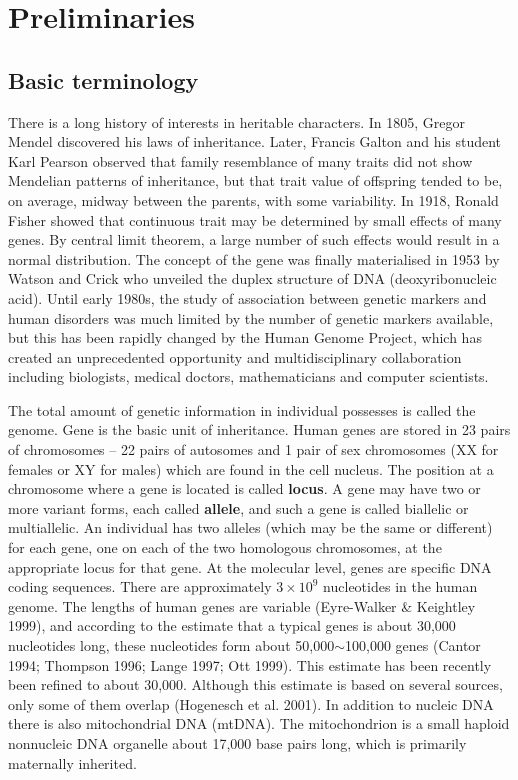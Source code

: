 \chapter{Preliminaries}

\section{Basic terminology}

There is a long history of interests in heritable characters.  In 1805, Gregor
Mendel discovered his laws of inheritance.  Later, Francis Galton and his
student Karl Pearson observed that family resemblance of many traits did not
show Mendelian patterns of inheritance, but that trait value of offspring
tended to be, on average, midway between the parents, with some variability.
In 1918, Ronald Fisher showed that continuous trait may be determined by small
effects of many genes.  By central limit theorem, a large number of such
effects would result in a normal distribution.  The concept of the gene was
finally materialised in 1953 by Watson and Crick who unveiled the duplex
structure of DNA (deoxyribonucleic acid).  Until early 1980s, the study of
association between genetic markers and human disorders was much limited by the
number of genetic markers available, but this has been rapidly changed by the
Human Genome Project, which has created an unprecedented opportunity and
multidisciplinary collaboration including biologists, medical doctors,
mathematicians and computer scientists.

The total amount of genetic information in individual possesses is called the
genome. Gene is the basic unit of inheritance.  Human genes are stored in 23
pairs of chromosomes -- 22 pairs of autosomes and 1 pair of sex chromosomes (XX
for females or XY for males) which are found in the cell nucleus.  The position
at a chromosome where a gene is located is called {\bf locus}.  A gene may have
two or more variant forms, each called {\bf allele}, and such a gene is called
biallelic or multiallelic.  An individual has two alleles (which may be the
same or different) for each gene, one on each of the two homologous
chromosomes, at the appropriate locus for that gene.  At the molecular level,
genes are specific DNA coding sequences.  There are approximately $3\times
10^9$ nucleotides in the human genome.  The lengths of human genes are variable
(Eyre-Walker \& Keightley 1999), and according to the estimate that a typical
genes is about 30,000 nucleotides long, these nucleotides form about
50,000$\sim$100,000 genes (Cantor 1994; Thompson 1996; Lange 1997; Ott 1999).
This estimate has been recently been refined to about 30,000. Although this
estimate is based on several sources, only some of them overlap (Hogenesch et
al.  2001).  In addition to nucleic DNA there is also mitochondrial DNA
(mtDNA).  The mitochondrion is a small haploid nonnucleic DNA organelle about
17,000 base pairs long, which is primarily maternally inherited.

